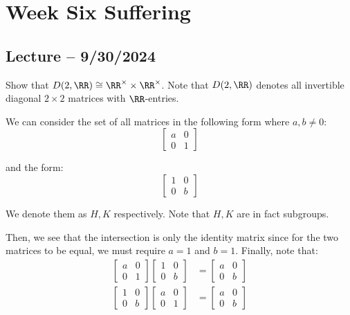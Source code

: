 \documentclass[openany]{book}
\begin{document}
\chapter{Week Six Suffering}
\section{Lecture -- 9/30/2024}
\begin{hw}
	Show that $D(2, \RR) \cong \RR^{\times} \times \RR^{\times}$. Note that $D(2, \RR)$ denotes all invertible diagonal $2 \times 2$ matrices with $\RR$-entries.
\end{hw}
\begin{solution}
	We can consider the set of all matrices in the following form where $a, b \neq 0$:
	\begin{equation*}
		\begin{bmatrix}
			a & 0 \\
			0 & 1
		\end{bmatrix}
	\end{equation*}

	and the form:
	\begin{equation*}
		\begin{bmatrix}
			1 & 0\\
			0 & b
		\end{bmatrix}
	\end{equation*}

	We denote them as $H, K$ respectively. Note that $H, K$ are in fact subgroups.
	
	Then, we see that the intersection is only the identity matrix since for the two matrices to be equal, we must require $a = 1$ and $b = 1$. Finally, note that:
	\begin{align*}
		\begin{bmatrix}
			a & 0 \\
			0 & 1 
		\end{bmatrix}
		\begin{bmatrix}
			1 & 0 \\
			0 & b
		\end{bmatrix} &= \begin{bmatrix}
		a & 0 \\
		0 & b
	\end{bmatrix} \\
	\begin{bmatrix}
		1 & 0 \\
		0 & b
	\end{bmatrix}
	\begin{bmatrix}
		a & 0 \\
		0 & 1
	\end{bmatrix} &= \begin{bmatrix}
		a & 0 \\
		0 & b
\end{bmatrix}
	\end{align*}


\end{solution}
\end{document}
